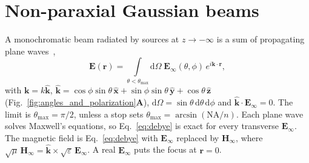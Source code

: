 \documentclass[
	aps,
	pra,
	reprint,
	amsmath,
	amssymb,
	superscriptaddress,
	nofootinbib
]{revtex4-2}
\begin{document}
\section{Non-paraxial Gaussian beams}


A monochromatic beam radiated by sources at $z\to-\infty$ is a sum of propagating plane waves~\cite{Wolf1959,RichardsWolf1959},
\begin{equation}
    \mathbf E(\mathbf r)=\int \limits_{\theta<\theta_{\max}}\mathrm{d}\Omega\;
    \mathbf{E}_\infty(\theta,\phi)\,e^{i\mathbf k\cdot\mathbf r},
    \label{eq:debye}
\end{equation}
with $\mathbf k=k\mathbf{\hat{k}}$, $\mathbf{\hat{k}} = \cos\phi \sin\theta\, \mathbf{\hat{x}} +\sin\phi \sin\theta\, \mathbf{\hat{y}} + \cos\theta\, \mathbf{\hat{z}}$ (Fig.~\ref{fig:angles_and_polarization}\textsf{\textbf{A}}), $\mathrm{d}\Omega=\sin\theta\,\mathrm{d}\theta\,\mathrm{d}\phi$ and $\mathbf{\hat{k}}\cdot\mathbf{E}_\infty=0$. The limit is $\theta_{\max}=\pi/2$, unless a stop sets $\theta_{\max}=\arcsin(\mathrm{NA}/n)$. Each plane wave solves Maxwell's equations, so Eq.~\eqref{eq:debye} is exact for every transverse $\mathbf{E}_\infty$. The magnetic field is Eq.~\eqref{eq:debye} with $\mathbf E_\infty$ replaced by $\mathbf H_\infty$, where $\sqrt{\mu}\,\mathbf H_\infty=\mathbf{\hat{k}}\times\sqrt{\varepsilon}\,\mathbf E_\infty$. A real $\mathbf E_\infty$ puts the focus at $\mathbf r=0$.
\end{document}
